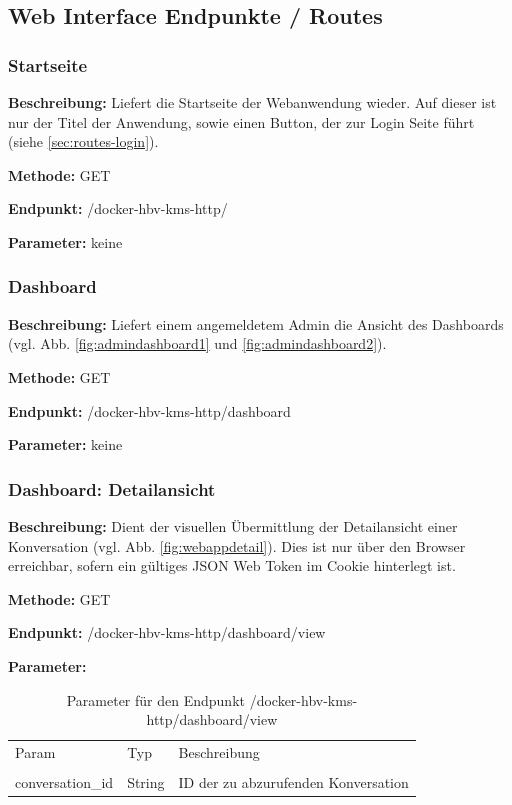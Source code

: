 \subsection{Web Interface Endpunkte / Routes}
\label{sec:routes}
\dotfill
\subsubsection{Startseite}
\label{sec:routes-start}
\textbf{Beschreibung:} Liefert die Startseite der Webanwendung wieder. Auf dieser ist nur der Titel der Anwendung, sowie einen Button, der zur Login Seite führt (siehe \ref{sec:routes-login}).

\textbf{Methode:} GET

\textbf{Endpunkt:} /docker-hbv-kms-http/

\textbf{Parameter:}
keine

\dotfill

\subsubsection{Dashboard}
\label{sec:routes-dashboard}
\textbf{Beschreibung:} Liefert einem angemeldetem Admin die Ansicht des Dashboards (vgl. Abb. \ref{fig:admindashboard1} und \ref{fig:admindashboard2}).

\textbf{Methode:} GET

\textbf{Endpunkt:} /docker-hbv-kms-http/dashboard

\textbf{Parameter:}
keine

\dotfill

\subsubsection{Dashboard: Detailansicht}
\label{sec:routes-dashboard-detail}
\textbf{Beschreibung:} Dient der visuellen Übermittlung der Detailansicht einer Konversation (vgl. Abb. \ref{fig:webappdetail}). Dies ist nur über den Browser erreichbar, sofern ein gültiges JSON Web Token im Cookie hinterlegt ist.

\textbf{Methode:} GET

\textbf{Endpunkt:} /docker-hbv-kms-http/dashboard/view

\textbf{Parameter:}
\begin{table}[H]
    \label{table:/docker-hbv-kms-http/dashboard/view}
    \caption{Parameter für den Endpunkt /docker-hbv-kms-http/dashboard/view}
    \setlength{\tabcolsep}{3pt}
    \begin{tabular}{p{100pt}p{80pt}p{200pt}}
        \toprule
        Param            & Typ    & Beschreibung                        \\                                                             \\
        \midrule
        conversation\_id & String & ID der zu abzurufenden Konversation \\
        \bottomrule
    \end{tabular}
\end{table}
\dotfill

